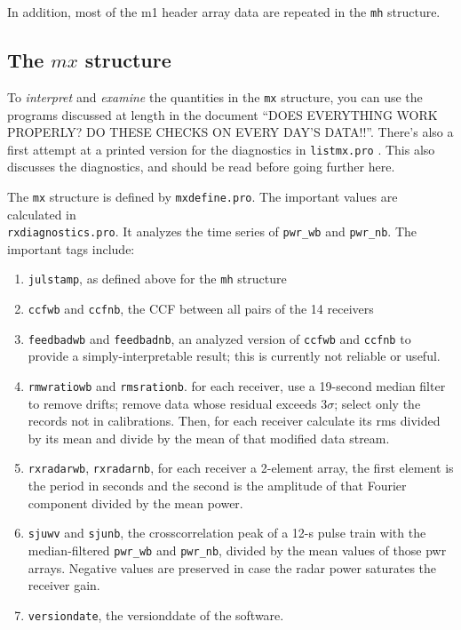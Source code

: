 \documentclass[psfig,preprint]{aastex}
\begin{document}
	In addition, most of the m1 header array data are repeated in
the \verb$mh$ structure.

\subsection{The $mx$ structure}

	To {\it interpret} and {\it examine} the quantities in the
\verb$mx$ structure, you can use the programs discussed at length in the
document ``DOES EVERYTHING WORK PROPERLY? DO THESE CHECKS ON EVERY DAY'S
DATA!!''.  There's also a first attempt at a printed version for the
diagnostics in \verb$listmx.pro$ .  This also discusses the diagnostics,
and should be read before going further here. 

	The \verb$mx$ structure is defined by \verb$mxdefine.pro$. The
important values are calculated in \\ \verb$rxdiagnostics.pro$. It analyzes
the time series of \verb$pwr_wb$ and \verb$pwr_nb$. The important tags
include: \begin{enumerate}

	\item \verb$julstamp$, as defined above for the \verb$mh$ structure

	\item \verb$ccfwb$ and \verb$ccfnb$, the CCF between all pairs
of the 14 receivers

	\item \verb$feedbadwb$ and \verb$feedbadnb$, an analyzed
version of  \verb$ccfwb$ and \verb$ccfnb$ to provide a
simply-interpretable result; this is currently not reliable or useful.

	\item \verb$rmwratiowb$ and \verb$rmsrationb$. for each receiver,
use a 19-second median filter to remove drifts; remove data whose
residual exceeds $3\sigma$; select only the records not in calibrations.
Then, for each receiver calculate its rms divided by its mean and 
divide by the mean of that modified data stream. 

	\item \verb$rxradarwb$, \verb$rxradarnb$, for each receiver a
2-element array, the first element is the period in seconds and the
second is the amplitude of that Fourier component divided by the mean
power. 

	\item \verb$sjuwv$ and \verb$sjunb$, the crosscorrelation peak
of a 12-s pulse train with the median-filtered \verb$pwr_wb$ and
\verb$pwr_nb$, divided by the mean values of those pwr arrays. Negative
values are preserved in case the radar power saturates the receiver
gain. 

	\item \verb$versiondate$, the versionddate of the software.
\end{enumerate}
\end{document}
